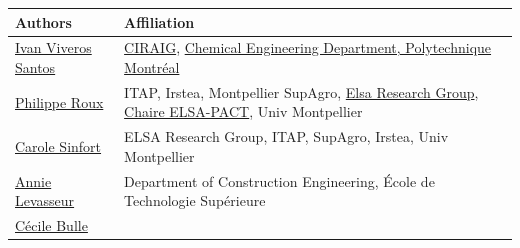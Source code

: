 \documentclass[openany]{book}
\begin{document}
\begin{longtable}[]{@{}ll@{}}
\toprule
\begin{minipage}[b]{0.43\columnwidth}\raggedright
Authors\strut
\end{minipage} & \begin{minipage}[b]{0.51\columnwidth}\raggedright
Affiliation\strut
\end{minipage}\tabularnewline
\midrule
\endhead
\begin{minipage}[t]{0.43\columnwidth}\raggedright
\href{https://ca.linkedin.com/in/ivan-viveros-santos}{Ivan Viveros Santos}\strut
\end{minipage} & \begin{minipage}[t]{0.51\columnwidth}\raggedright
\href{http://www.ciraig.org/fr/}{CIRAIG}, \href{https://www.polymtl.ca/gch/}{Chemical Engineering Department, Polytechnique Montréal}\strut
\end{minipage}\tabularnewline
\begin{minipage}[t]{0.43\columnwidth}\raggedright
\href{http://www.elsa-lca.org/?p=137\&lang=en}{Philippe Roux}\strut
\end{minipage} & \begin{minipage}[t]{0.51\columnwidth}\raggedright
ITAP, Irstea, Montpellier SupAgro, \href{http://www.elsa-lca.org/?lang=en}{Elsa Research Group}, \href{http://www.elsa-pact.fr/language/en/}{Chaire ELSA-PACT}, Univ Montpellier\strut
\end{minipage}\tabularnewline
\begin{minipage}[t]{0.43\columnwidth}\raggedright
\href{http://www.elsa-lca.org/?tag=carole-sinfort\&lang=en}{Carole Sinfort}\strut
\end{minipage} & \begin{minipage}[t]{0.51\columnwidth}\raggedright
ELSA Research Group, ITAP, SupAgro, Irstea, Univ Montpellier\strut
\end{minipage}\tabularnewline
\begin{minipage}[t]{0.43\columnwidth}\raggedright
\href{https://www.etsmtl.ca/en/research/professors/alevasseur/}{Annie Levasseur}\strut
\end{minipage} & \begin{minipage}[t]{0.51\columnwidth}\raggedright
Department of Construction Engineering, École de Technologie Supérieure\strut
\end{minipage}\tabularnewline
\begin{minipage}[t]{0.43\columnwidth}\raggedright
\href{https://professeurs.uqam.ca/professeur/bulle.cecile/}{Cécile Bulle}\strut

\end{minipage}
\end{longtable}
\end{document}
